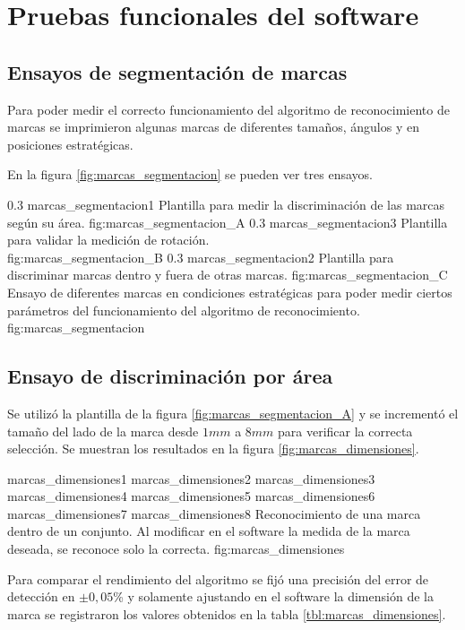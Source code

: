 \section{Pruebas funcionales del software}
\label{sec:pruebasHW}

\subsection{Ensayos de segmentación de marcas}
Para poder medir el correcto funcionamiento del algoritmo de reconocimiento de marcas se imprimieron algunas marcas de diferentes tamaños, ángulos y en posiciones estratégicas.\par
En la figura \ref{fig:marcas_segmentacion} se pueden ver tres ensayos.

   \subfigabc
   {0.3} {marcas_segmentacion1} {Plantilla para medir la discriminación de las marcas según su área.} {fig:marcas_segmentacion_A}
   {0.3} {marcas_segmentacion3} {Plantilla para validar la medición de rotación.\\ \vphantom{1}} {fig:marcas_segmentacion_B}
   {0.3} {marcas_segmentacion2} {Plantilla para discriminar marcas dentro y fuera de otras marcas.} {fig:marcas_segmentacion_C}
   {Ensayo de diferentes marcas en condiciones estratégicas para poder medir ciertos parámetros del funcionamiento del algoritmo de reconocimiento.}
   {fig:marcas_segmentacion}

\subsection{Ensayo de discriminación por área}

Se utilizó la plantilla de la figura \ref{fig:marcas_segmentacion_A} y se incrementó el tamaño del lado de la marca desde $1 mm$ a $8 mm$ para verificar la correcta selección. Se muestran los resultados en la figura \ref{fig:marcas_dimensiones}.

\subfigfourfour
   {marcas_dimensiones1}
   {marcas_dimensiones2}
   {marcas_dimensiones3}
   {marcas_dimensiones4}
   {marcas_dimensiones5}
   {marcas_dimensiones6}
   {marcas_dimensiones7}
   {marcas_dimensiones8}
   {Reconocimiento de una marca dentro de un conjunto. Al modificar en el software la medida de la marca deseada, se reconoce solo la correcta.}
   {fig:marcas_dimensiones}

   Para comparar el rendimiento del algoritmo se fijó una precisión del error de detección en $\pm0,05$\% y solamente ajustando en el software la dimensión de la marca se registraron los valores obtenidos en la tabla \ref{tbl:marcas_dimensiones}.\par

